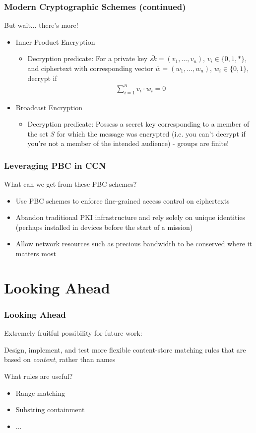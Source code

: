 \documentclass[handout]{beamer}
\begin{document}
\begin{frame}
	\frametitle{Modern Cryptographic Schemes (continued)}
	But wait... there's more!
	\begin{itemize}
		\item Inner Product Encryption
		\begin{itemize}
			\item Decryption predicate: For a private key $\bar{sk} = (v_1,\dots,v_n)$, $v_i \in \{0,1,*\}$, and ciphertext with corresponding vector $\bar{w} = (w_1,\dots,w_n)$, $w_i \in \{0,1\}$, decrypt if 
			\begin{align*}
				\sum_{i=1}^n v_i \cdot w_i = 0
			\end{align*}
		\end{itemize}
		\pause
		\item Broadcast Encryption
		\begin{itemize}
			\item Decryption predicate: Possess a secret key corresponding to a member of the set $S$ for which the message was encrypted (i.e. you can't decrypt if you're not a member of the intended audience) - groups are finite!
		\end{itemize}
	\end{itemize}
\end{frame}

\begin{frame}
	\frametitle{Leveraging PBC in CCN}
	What can we get from these PBC schemes?
	\begin{itemize}
		\item Use PBC schemes to enforce fine-grained access control on ciphertexts
		\item Abandon traditional PKI infrastructure and rely solely on unique identities (perhaps installed in devices before the start of a mission)
		\item Allow network resources such as precious bandwidth to be conserved where it matters most
	\end{itemize}
\end{frame}

\section{Looking Ahead}
\begin{frame}
	\frametitle{Looking Ahead}
	Extremely fruitful possibility for future work:
	\begin{center}
		Design, implement, and test more flexible content-store matching rules that are based on \emph{content}, rather than names
	\end{center}

	What rules are useful?
	\begin{itemize}
		\item Range matching
		\item Substring containment
		\item ...
	\end{itemize}
\end{frame}
\end{document}
